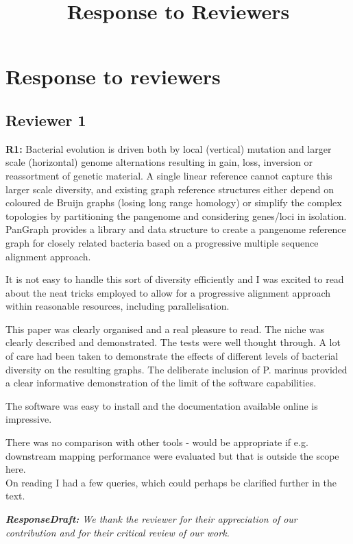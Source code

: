 \documentclass[aps,rmp,onecolumn]{revtex4-1}
\title{Response to Reviewers}
\newcommand{\reviewer}[2]{\textbf{#1:} #2\vskip 5mm}
\newcommand{\responsedraft}[1]{{\it {\color{purple}\textbf{ResponseDraft:} #1}}\vskip 5mm}
\begin{document}
\maketitle

\section*{Response to reviewers}

\subsection*{Reviewer 1}

\reviewer{R1}{Bacterial evolution is driven both by local (vertical) mutation and larger scale (horizontal) genome alternations resulting in gain, loss, inversion or reassortment of genetic material. A single linear reference cannot capture this larger scale diversity, and existing graph reference structures either depend on coloured de Bruijn graphs (losing long range homology) or simplify the complex topologies by partitioning the pangenome and considering genes/loci in isolation. PanGraph provides a library and data structure to create a pangenome reference graph for closely related bacteria based on a progressive multiple sequence alignment approach.

      It is not easy to handle this sort of diversity efficiently and I was excited to read about the neat tricks employed to allow for a progressive alignment approach within reasonable resources, including parallelisation.

      This paper was clearly organised and a real pleasure to read. The niche was clearly described and demonstrated. The tests were well thought through. A lot of care had been taken to demonstrate the effects of different levels of bacterial diversity on the resulting graphs. The deliberate inclusion of P. marinus provided a clear informative demonstration of the limit of the software capabilities.

      The software was easy to install and the documentation available online is impressive.

      There was no comparison with other tools - would be appropriate if e.g. downstream mapping performance were evaluated but that is outside the scope here.\\

      On reading I had a few queries, which could perhaps be clarified further in the text.}

\responsedraft{We thank the reviewer for their appreciation of our contribution and for their critical review of our work.}
\end{document}
